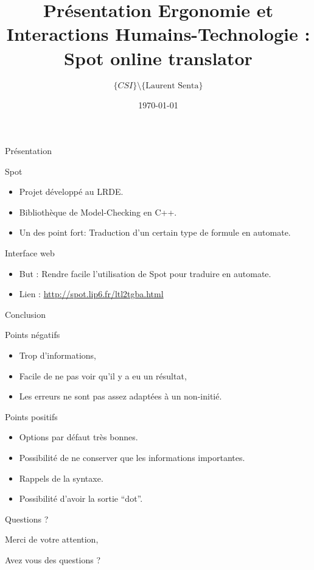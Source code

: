 \documentclass{beamer}
\author {$\{CSI\} \setminus \{\text{Laurent Senta}\}$}
\date\today
\title[Ergonomie: Spot online ]{Présentation Ergonomie et Interactions Humains-Technologie : \og Spot online translator\fg}
\institute{Epita - CSI}
\begin{document}
\begin{frame}
  \maketitle
\end{frame}


\begin{frame}{Présentation}
  \begin{block}{Spot}
    \begin{itemize}
    \item Projet développé au LRDE.
    \item Bibliothèque de Model-Checking en C++.
    \item Un des point fort: Traduction d'un certain type de formule
      en automate.
    \end{itemize}
  \end{block}

  \begin{block}{Interface web}
    \begin{itemize}
    \item But : Rendre facile l'utilisation de Spot pour traduire en
      automate.
    \item Lien : \url{http://spot.lip6.fr/ltl2tgba.html}
    \end{itemize}
  \end{block}

\end{frame}












\begin{frame}{Conclusion}
  \begin{block}{Points négatifs}
    \begin{itemize}
    \item Trop d'informations,
    \item Facile de ne pas voir qu'il y a eu un résultat,
    \item Les erreurs ne sont pas assez adaptées à un non-initié.
    \end{itemize}
  \end{block}

  \begin{block}{Points positifs}
    \begin{itemize}
    \item Options par défaut très bonnes.
    \item Possibilité de ne conserver que les informations importantes.
    \item Rappels de la syntaxe.
    \item Possibilité d'avoir la sortie ``dot''.
    \end{itemize}
  \end{block}
\end{frame}

\begin{frame}{Questions ?}

  Merci de votre attention,

  Avez vous des questions ?
\end{frame}
\end{document}
